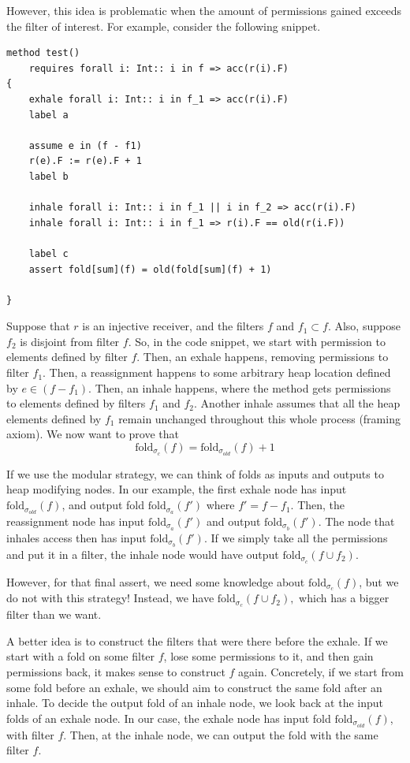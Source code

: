 \documentclass[msc,oneside]{ubcthesis}
\theoremstyle{definition}
\begin{document}
However, this idea is problematic when the amount of permissions gained exceeds the filter of interest. For example, consider the following snippet.
\begin{lstlisting}
method test()
    requires forall i: Int:: i in f => acc(r(i).F)
{
    exhale forall i: Int:: i in f_1 => acc(r(i).F)
    label a
    
    assume e in (f - f1)
    r(e).F := r(e).F + 1
    label b
    
    inhale forall i: Int:: i in f_1 || i in f_2 => acc(r(i).F) 
    inhale forall i: Int:: i in f_1 => r(i).F == old(r(i.F))
            
    label c
    assert fold[sum](f) = old(fold[sum](f) + 1)

}
\end{lstlisting}
Suppose that $r$ is an injective receiver, and the filters $f$ and $f_1 \subset f$. Also, suppose $f_2$ is disjoint from filter $f$. So, in the code snippet, we start with permission to elements defined by filter $f$. Then, an exhale happens, removing permissions to filter $f_1$. Then, a reassignment happens to some arbitrary heap location defined by $e \in (f - f_1)$. Then, an inhale happens, where the method gets permissions to elements defined by filters $f_1$ and $f_2$. Another inhale assumes that all the heap elements defined by $f_1$ remain unchanged throughout this whole process (framing axiom). We now want to prove that 
$$\textrm{fold}_{\sigma_{c}}(f) = \textrm{fold}_{\sigma_{old}}(f) + 1$$

If we use the modular strategy, we can think of folds as inputs and outputs to heap modifying nodes. In our example, the first exhale node has input $\textrm{fold}_{\sigma_{old}}(f)$, and output fold $\textrm{fold}_{\sigma_{a}}(f')$ where $f' = f - f_1$. Then, the reassignment node has input 
$\textrm{fold}_{\sigma_{a}}(f')$ and output $\textrm{fold}_{\sigma_{b}}(f')$.
The node that inhales access then has input $\textrm{fold}_{\sigma_{b}}(f')$. If we simply take all the permissions and put it in a filter, the inhale node would have output $\textrm{fold}_{\sigma_{c}}(f \cup f_2 ).$

However, for that final assert, we need some knowledge about $\textrm{fold}_{\sigma_{c}}(f)$, but we do not with this strategy! Instead, we have $\textrm{fold}_{\sigma_{c}}(f \cup f_2 ),$ which has a bigger filter than we want.

A better idea is to construct the filters that were there before the exhale. If we start with a fold on some filter $f$, lose some permissions to it, and then gain permissions back, it makes sense to construct $f$ again. Concretely, if we start from some fold before an exhale, we should aim to construct the same fold after an inhale. To decide the output fold of an inhale node, we look back at the input folds of an exhale node. In our case, the exhale node has input fold $\textrm{fold}_{\sigma_{old}}(f)$, with filter $f$. Then, at the inhale node, we can output the fold with the same filter $f$.
\end{document}
